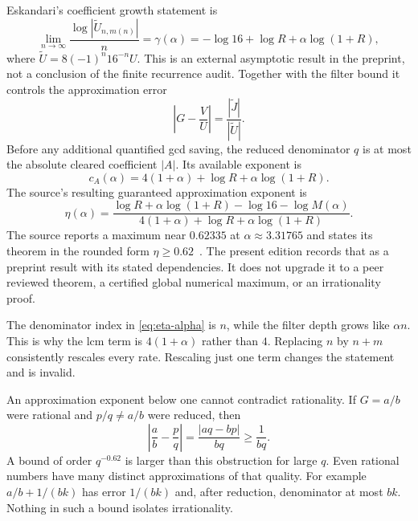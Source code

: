Eskandari's coefficient growth statement is
\begin{equation}
 \lim_{n\to\infty}\frac{\log|\widetilde U_{n,m(n)}|}{n}
 =\gamma(\alpha)
 =-\log16+\log R+\alpha\log(1+R),
 \label{eq:gamma-alpha}
\end{equation}
where $\widetilde U=8(-1)^n16^{-n}U$. This is an external asymptotic result in the preprint, not a conclusion of the finite recurrence audit. Together with the filter bound it controls the approximation error
\begin{equation}
 \left|G-\frac VU\right|
 =\frac{|\widetilde J|}{|\widetilde U|}.
 \label{eq:approximation-error}
\end{equation}
Before any additional quantified gcd saving, the reduced denominator $q$ is at most the absolute cleared coefficient $|A|$. Its available exponent is
\begin{equation}
 c_A(\alpha)=4(1+\alpha)+\log R+\alpha\log(1+R).
 \label{eq:cA-alpha}
\end{equation}
The source's resulting guaranteed approximation exponent is
\begin{equation}
 \eta(\alpha)=
 \frac{\log R+\alpha\log(1+R)-\log16-\log M(\alpha)}
 {4(1+\alpha)+\log R+\alpha\log(1+R)}.
 \label{eq:eta-alpha}
\end{equation}
The source reports a maximum near $0.62335$ at $\alpha\approx3.31765$ and states its theorem in the rounded form $\eta\geq0.62$~\cite{Eskandari2026}. The present edition records that as a preprint result with its stated dependencies. It does not upgrade it to a peer reviewed theorem, a certified global numerical maximum, or an irrationality proof.

The denominator index in \eqref{eq:eta-alpha} is $n$, while the filter depth grows like $\alpha n$. This is why the lcm term is $4(1+\alpha)$ rather than $4$. Replacing $n$ by $n+m$ consistently rescales every rate. Rescaling just one term changes the statement and is invalid.

An approximation exponent below one cannot contradict rationality. If $G=a/b$ were rational and $p/q\ne a/b$ were reduced, then
\begin{equation}
 \left|\frac ab-\frac pq\right|
 =\frac{|aq-bp|}{bq}\geq\frac1{bq}.
 \label{eq:rational-approx-lower}
\end{equation}
A bound of order $q^{-0.62}$ is larger than this obstruction for large $q$. Even rational numbers have many distinct approximations of that quality. For example $a/b+1/(bk)$ has error $1/(bk)$ and, after reduction, denominator at most $bk$. Nothing in such a bound isolates irrationality.

